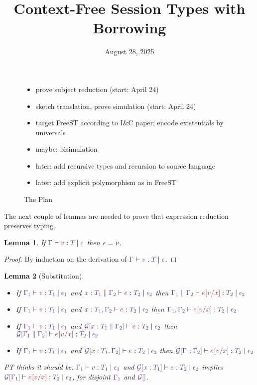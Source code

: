 \documentclass{article}
\title{Context-Free Session Types with Borrowing}
\date{August 28, 2025}
\newtheorem{lemma}{Lemma}
\begin{document}
\maketitle

\begin{figure}[tp]
  \begin{itemize}
  \item prove subject reduction (start: April 24)
  \item sketch translation, prove simulation (start: April 24)
  \item target FreeST according to I\&C paper; encode existentials by
    universals
  \item maybe: bisimulation
  \item later: add recursive types and recursion to source language
  \item later: add explicit polymorphism as in FreeST
  \end{itemize}
  \caption{The Plan}
  \label{fig:the-plan}
\end{figure}


The next couple of lemmas are needed to prove that
expression reduction preserves typing.

\begin{lemma}
  If $\HasType {\Ctx} {\V} {\T} {\Eff}$
  then $\Eff = \EffPure$.
\end{lemma}
\begin{proof}
  By induction on the derivation of $\HasType {\Ctx} {\V} {\T} {\Eff}$.
\end{proof}

\begin{lemma}[Substitution]\
  \begin{itemize}
    \item If $\HasType {\Ctx[1]} {\V} {\T[1]} {\Eff[1]}$ and
    $\HasType {\CtxExtUnord{\CtxVar x{\T[1]}}{\Ctx[2]}} {\E} {\T[2]} {\Eff[2]}$
    then 
    $\HasType {\CtxExtUnord{\Ctx[1]}{\Ctx[2]}} {\Subs\E\V x} {\T[2]} {\Eff[2]}$
    \item If $\HasType {\Ctx[1]} {\V} {\T[1]} {\Eff[1]}$ and
    $\HasType {\CtxExt{\CtxVar x{\T[1]}}{\Ctx[2]}} {\E} {\T[2]} {\Eff[2]}$
    then 
    $\HasType {\CtxExt{\Ctx[1]}{\Ctx[2]}} {\Subs\E\V x} {\T[2]} {\Eff[2]}$
    \item If $\HasType {\Ctx[1]} {\V} {\T[1]} {\Eff[1]}$
    and
    $\HasType
    {\CtxPattern{\CtxExtUnord{\CtxVar x{\T[1]}}{\Ctx[2]}}}
    {\E}
    {\T[2]}
    {\Eff[2]}$ then 
    $\HasType {\CtxPattern{\CtxExtUnord{\Ctx[1]}{\Ctx[2]}}} {\Subs\E\V x} {\T[2]} {\Eff[2]}$
  \item If $\HasType {\Ctx[1]} {\V} {\T[1]} {\Eff[1]}$
    and
    $\HasType
    {\CtxPattern{\CtxExt{\CtxVar x{\T[1]}}{\Ctx[2]}}}
    {\E}
    {\T[2]}
    {\Eff[2]}$ then 
    $\HasType {\CtxPattern{\CtxExt{\Ctx[1]}{\Ctx[2]}}} {\Subs\E\V x} {\T[2]} {\Eff[2]}$
  \end{itemize}
  PT thinks it should be:
  $\HasType {\Ctx[1]} {\V} {\T[1]} {\Eff[1]}$
  and
  $\HasType
    {\CtxPattern{\CtxVar x{\T[1]}}}
    {\E}
    {\T[2]}
    {\Eff[2]}$
    implies
    $\HasType {\CtxPattern{{\Ctx[1]}}} {\Subs\E\V x} {\T[2]}
    {\Eff[2]}$, for disjoint $\Ctx[1]$ and $\CtxPattern{}$.
\end{lemma}
\end{document}
